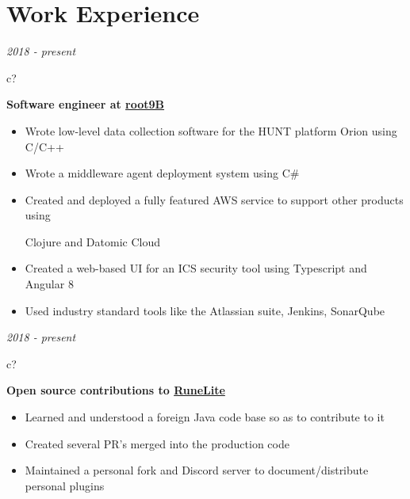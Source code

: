 \documentclass[12pt,a4paper,sans]{moderncv} %
\begin{document}
\vspace{-4 mm}
\section{Work Experience}

\textit{2018 - present}
\hspace{-1.7 mm}
\begin{tabular}{c?}
 \\
\end{tabular}
 \hspace{2 mm}
 \textbf{Software engineer at \href{https://www.root9b.com/}{root9B}}

 \vspace{-1 mm}
 \begin{itemize}
 \addtolength{\itemindent}{31.7 mm}
 \vspace{2 pt}
 \item{Wrote low-level data collection software for the HUNT platform Orion using C/C++}
 \item{Wrote a middleware agent deployment system using C\#}
 \item{Created and deployed a fully featured AWS service to support other products using 
 
 \hspace{30.5 mm} Clojure and Datomic Cloud}
 \item{Created a web-based UI for an ICS security tool using Typescript and Angular 8}
 \item{Used industry standard tools like the Atlassian suite, Jenkins, SonarQube}
 \end{itemize}
 
\textit{2018 - present}
\hspace{-1.7 mm}
\begin{tabular}{c?}
 \\
\end{tabular}
 \hspace{2 mm}
 \textbf{Open source contributions to \href{https://runelite.net}{RuneLite}}

 \vspace{-1 mm}
 \begin{itemize}
 \addtolength{\itemindent}{31.7 mm}
 \vspace{2 pt}
 \item{Learned and understood a foreign Java code base so as to contribute to it}
 \item{Created several PR's merged into the production code}
 \item{Maintained a personal fork and Discord server to document/distribute personal plugins}
 \end{itemize}
 
\end{document}
